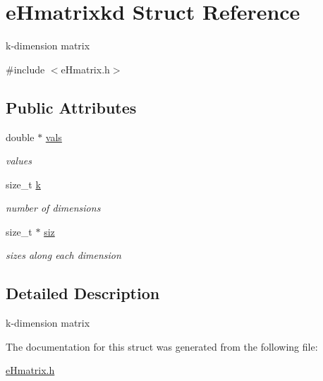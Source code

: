 \hypertarget{structeHmatrixkd}{\section{e\-Hmatrixkd Struct Reference}
\label{structeHmatrixkd}
}


k-\/dimension matrix  




{\ttfamily \#include $<$e\-Hmatrix.\-h$>$}

\subsection*{Public Attributes}
\begin{DoxyCompactItemize}
\item 
\hypertarget{structeHmatrixkd_ae7de065fc810e5c2e41e2377de0602c9}{double $\ast$ \hyperlink{structeHmatrixkd_ae7de065fc810e5c2e41e2377de0602c9}{vals}}\label{structeHmatrixkd_ae7de065fc810e5c2e41e2377de0602c9}

\begin{DoxyCompactList}\small\item\em values \end{DoxyCompactList}\item 
\hypertarget{structeHmatrixkd_ae3409e38124e9826742023bc20196b7c}{size\-\_\-t \hyperlink{structeHmatrixkd_ae3409e38124e9826742023bc20196b7c}{k}}\label{structeHmatrixkd_ae3409e38124e9826742023bc20196b7c}

\begin{DoxyCompactList}\small\item\em number of dimensions \end{DoxyCompactList}\item 
\hypertarget{structeHmatrixkd_a4980c0883254b98f99aefdf0d38e23a1}{size\-\_\-t $\ast$ \hyperlink{structeHmatrixkd_a4980c0883254b98f99aefdf0d38e23a1}{siz}}\label{structeHmatrixkd_a4980c0883254b98f99aefdf0d38e23a1}

\begin{DoxyCompactList}\small\item\em sizes along each dimension \end{DoxyCompactList}\end{DoxyCompactItemize}


\subsection{Detailed Description}
k-\/dimension matrix 

The documentation for this struct was generated from the following file\-:\begin{DoxyCompactItemize}
\item 
\hyperlink{eHmatrix_8h}{e\-Hmatrix.\-h}\end{DoxyCompactItemize}
